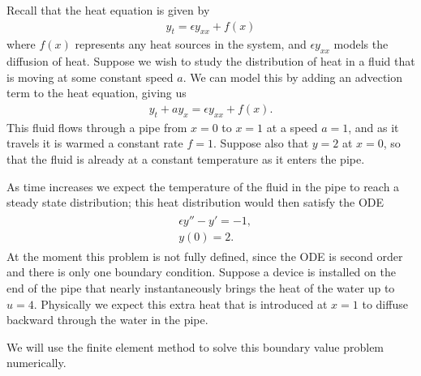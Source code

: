 \label{lab:FEM}
Recall that the heat equation is given by 
\begin{align*}
y_t = \epsilon y_{xx} + f(x) %
\end{align*}
where $f(x)$ represents any heat sources in the system, and $\epsilon y_{xx}$ models the diffusion of heat. Suppose we wish to study the distribution of heat in a fluid that is moving at some constant speed $a$. We can model this by adding an advection term to the heat equation, giving us 
\begin{align*}
y_t + ay_x = \epsilon y_{xx} + f(x). %
\end{align*}
This fluid flows through a pipe from $x = 0$ to $x = 1$ at a speed $a = 1$, and as it travels it is warmed a constant rate $f= 1$.  Suppose also that $y = 2$ at $x = 0$, so that the fluid is already at a constant temperature as it enters the pipe. 


As time increases we expect the temperature of the fluid in the pipe to reach a steady state distribution; this heat distribution would then satisfy the ODE 
\begin{align}
\begin{split}
&{ } \epsilon y'' - y' = -1,\\
&{ } y(0) = 2. 
\end{split}\label{FEM:steady_state}
\end{align}
At the moment this problem is not fully defined, since the ODE is second order and there is only one boundary condition.  Suppose a device is installed on the end of the pipe that nearly instantaneously brings the heat of the water up to $u = 4$.  Physically we expect this extra heat that is introduced at $x = 1$ to diffuse backward through the water in the pipe.



We will use the finite element method to solve this boundary value problem numerically. 
 

